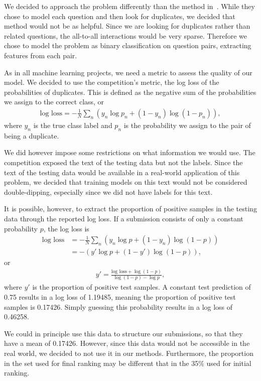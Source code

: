 \documentclass{article} %
\begin{document}
We decided to approach the problem differently than the method in~\cite{Zhang2015}. While they chose to model each question and then look for duplicates, we decided that method would not be as helpful. Since we are looking for duplicates rather than related questions, the all-to-all interactions would be very sparse. Therefore we chose to model the problem as binary classification on question pairs, extracting features from each pair. 

As in all machine learning projects, we need a metric to assess the quality of our model. We decided to use the competition's metric, the log loss of the probabilities of duplicates. This is defined as the negative sum of the probabilities we assign to the correct class, or
\begin{align}
\text{log loss} = -\frac{1}{N}\sum_n \left(y_n\log p_n + (1-y_n)\log(1-p_n)\right),
\end{align} 
where $y_n$ is the true class label and $p_n$ is the probability we assign to the pair of being a duplicate. 

We did however impose some restrictions on what information we would use. The competition exposed the text of the testing data but not the labels. Since the text of the testing data would be available in a real-world application of this problem, we decided that training models on this text would not be considered double-dipping, especially since we did not have labels for this text. 

It is possible, however, to extract the proportion of positive samples in the testing data through the reported log loss. If a submission consists of only a constant probability $p$, the log loss is
\begin{align}
\text{log loss} &= -\frac{1}{N}\sum_n \left(y_n\log p + (1-y_n)\log(1-p)\right)
	\nonumber\\
&= -\left(y'\log p + (1-y')\log(1-p)\right),
\end{align}
or 
\begin{align}
y' = \frac{\text{log loss} + \log(1-p)}{\log(1-p)-\log p},
\end{align}
where $y'$ is the proportion of positive test samples. A constant test prediction of 0.75 results in a log loss of 1.19485, meaning the proportion of positive test samples is 0.17426. Simply guessing this probability results in a log loss of 0.46258. 

We could in principle use this data to structure our submissions, so that they have a mean of 0.17426. However, since this data would not be accessible in the real world, we decided to not use it in our methods. Furthermore, the proportion in the set used for final ranking may be different that in the 35\% used for initial ranking.
\end{document}
